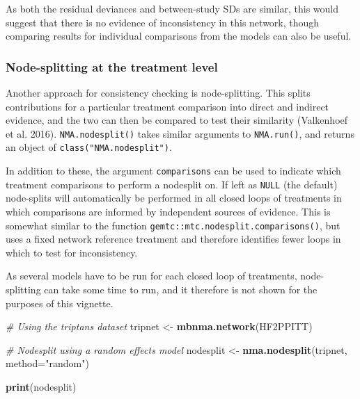 \documentclass[]{article}
\newenvironment{Shaded}{\begin{snugshade}}{\end{snugshade}}
\newcommand{\CommentTok}[1]{\textcolor[rgb]{0.56,0.35,0.01}{\textit{#1}}}
\newcommand{\DataTypeTok}[1]{\textcolor[rgb]{0.13,0.29,0.53}{#1}}
\newcommand{\KeywordTok}[1]{\textcolor[rgb]{0.13,0.29,0.53}{\textbf{#1}}}
\newcommand{\NormalTok}[1]{#1}
\newcommand{\StringTok}[1]{\textcolor[rgb]{0.31,0.60,0.02}{#1}}
\begin{document}
As both the residual deviances and between-study SDs are similar, this
would suggest that there is no evidence of inconsistency in this
network, though comparing results for individual comparisons from the
models can also be useful.

\hypertarget{node-splitting-at-the-treatment-level}{%
\subsubsection{Node-splitting at the treatment
level}\label{node-splitting-at-the-treatment-level}}

Another approach for consistency checking is node-splitting. This splits
contributions for a particular treatment comparison into direct and
indirect evidence, and the two can then be compared to test their
similarity (Valkenhoef et al. 2016). \texttt{NMA.nodesplit()} takes
similar arguments to \texttt{NMA.run()}, and returns an object of
\texttt{class("NMA.nodesplit")}.

In addition to these, the argument \texttt{comparisons} can be used to
indicate which treatment comparisons to perform a nodesplit on. If left
as \texttt{NULL} (the default) node-splits will automatically be
performed in all closed loops of treatments in which comparisons are
informed by independent sources of evidence. This is somewhat similar to
the function \texttt{gemtc::mtc.nodesplit.comparisons()}, but uses a
fixed network reference treatment and therefore identifies fewer loops
in which to test for inconsistency.

As several models have to be run for each closed loop of treatments,
node-splitting can take some time to run, and it therefore is not shown
for the purposes of this vignette.

\begin{Shaded}
\begin{Highlighting}[]
\CommentTok{# Using the triptans dataset}
\NormalTok{tripnet <-}\StringTok{ }\KeywordTok{mbnma.network}\NormalTok{(HF2PPITT)}

\CommentTok{# Nodesplit using a random effects model}
\NormalTok{nodesplit <-}\StringTok{ }\KeywordTok{nma.nodesplit}\NormalTok{(tripnet, }\DataTypeTok{method=}\StringTok{"random"}\NormalTok{)}
\end{Highlighting}
\end{Shaded}

\begin{Shaded}
\begin{Highlighting}[]
\KeywordTok{print}\NormalTok{(nodesplit)}
\end{Highlighting}
\end{Shaded}
\end{document}
